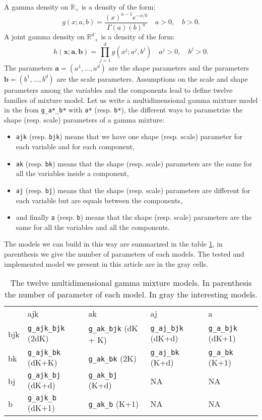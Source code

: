 \documentclass[a4paper,10pt]{article}
\newcommand{\R}{\mathbb{R}}
\newcommand{\Rd}{{\mathbb{R}^d}}
\newcommand{\ba}{\mathbf{a}}
\newcommand{\bb}{\mathbf{b}}
\newcommand{\bx}{\mathbf{x}}
\begin{document}
A gamma density on $\R_+$ is a density of the form:
\begin{equation}\label{law::gamma-density}
g(x;a,b) = \frac{ \left(x\right)^{a-1} e^{-x/b}}{\Gamma(a) \left(b\right)^{a}} \quad a>0, \quad b>0.
\end{equation}
A joint gamma density on $\Rd_+$ is a density of the form:
\begin{equation}\label{law::joint-gamma-density}
h(\bx;\ba,\bb) = \prod_{j=1}^d g(x^j;a^j,b^j) \quad a^j>0, \quad b^j>0.
\end{equation}
The parameters $\ba=(a^1,\ldots,a^d)$ are the shape parameters and the parameters $\bb=(b^1,\ldots,b^d)$ are the
scale parameters. Assumptions on the scale and shape parameters among the variables and the components
lead to define twelve families of mixture model. Let us write a multidimensional gamma mixture model in the from \verb+g_a*_b*+
with \verb+a*+ (resp. \verb+b*+), the different ways to parametrize the shape (resp. scale) parameters of a gamma mixture:
\begin{itemize}
\item \verb+ajk+ (resp. \verb+bjk+) means that we have one shape (resp. scale) parameter for each variable and for each component,
\item \verb+ak+ (resp. \verb+bk+) means that the shape (resp. scale) parameters are the same for all the variables inside a component,
\item \verb+aj+ (resp. \verb+bj+) means that the shape (resp. scale) parameters are different for each variable but are equals between the components,
\item and finally \verb+a+ (resp. \verb+b+) means that the shape (resp. scale) parameters are the same for all the variables and all the components.
\end{itemize}

The models we can build in this way are summarized in the table \ref{tab:gammamodels}, in parenthesis we give the number of
parameters of each models. The tested and implemented model we present in this article are in the gray cells.
\begin{table}
\begin{center}
\begin{tabular}{lllll}
           &  ajk                 &  ak          &  aj           &  a \\
bjk & {\color{gray} \verb+g_ajk_bjk+} (2dK)  & \verb+g_ak_bjk+ (dK + K)& {\color{gray} \verb+g_aj_bjk+} (dK+d) & \verb+g_a_bjk+ (dK+1)\\
bk  & {\color{gray} \verb+g_ajk_bk+}  (dK+K) & \verb+g_ak_bk+ (2K)     & {\color{gray} \verb+g_aj_bk+} (K+d) & \verb+g_a_bk+ (K+1) \\
bj  & {\color{gray} \verb+g_ajk_bj+}  (dK+d) & \verb+g_ak_bj+ (K+d)    & NA  & NA  \\
b   & {\color{gray} \verb+g_ajk_b+}   (dK+1) & \verb+g_ak_b+ (K+1)     & NA & NA \\
\end{tabular}
\end{center}
\caption{The twelve multidimensional gamma mixture models. In parenthesis the number of parameter of each model. In gray the
interesting models.}
\label{tab:gammamodels}
\end{table}
\end{document}
